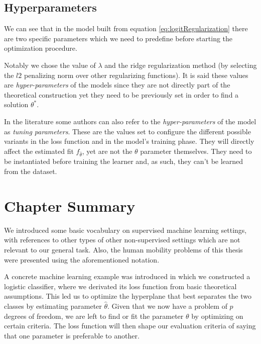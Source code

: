 \subsection{Hyperparameters}

We can see that in the model built from equation \cref{eq:logitRegularization} there are two specific parameters which we need to predefine before starting the optimization procedure.

Notably we chose the value of $\lambda$ and the ridge regularization method (by selecting the $l2$ penalizing norm over other regularizing functions). %
It is said these values are \textit{hyper-parameters} of the models since they are not directly part of the theoretical construction yet they need to be previously set in order to find a solution $\theta^\ast$.

In the literature some authors can also refer to the \textit{hyper-parameters} of the model as \textit{tuning parameters}.
These are the values set to configure the different possible variants in the loss function and in the model's training phase.
They will directly affect the estimated fit $f_{\hat{\theta}}$, yet are not the $\theta$ parameter themselves.
They need to be instantiated before training the learner and, as such, they can't be learned from the dataset.




\section{Chapter Summary}\label{section-ch_machine_learning_summary}

We introduced some basic vocabulary on supervised machine learning settings, with references to other types of other non-supervised settings which are not relevant to our general task.
Also, the human mobility problems of this thesis were presented using the aforementioned notation.

A concrete machine learning example was introduced in which we constructed a logistic classifier, where we derivated its loss function from basic theoretical assumptions.
This led us to optimize the hyperplane that best separates the two classes by estimating parameter $\hat{\theta}$.
Given that we now have a problem of $p$ degrees of freedom, we are left to find or fit the parameter $\theta$ by optimizing on certain criteria.
The loss function will then shape our evaluation criteria of saying that one parameter is preferable to another.

